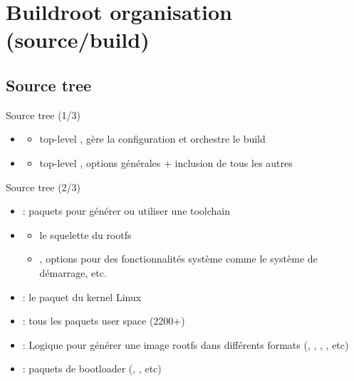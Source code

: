 \documentclass[aspectratio=169,obeyspaces,spaces,hyphens,dvipsnames]{beamer}
\begin{document}
\section{Buildroot organisation (source/build)}

\subsection{Source tree}

\begin{frame}{Source tree (1/3)}
  \begin{itemize}
  \item {}
    \begin{itemize}
    \item top-level , gère la configuration et orchestre le build
    \end{itemize}
  \item {}
    \begin{itemize}
    \item top-level , options générales + inclusion de tous les
      autres 
    \end{itemize}
  \end{itemize}
\end{frame}

\begin{frame}{Source tree (2/3)}
  \begin{itemize}
  \item {} : paquets pour générer ou utiliser une toolchain
  \item {}
    \begin{itemize}
    \item {} le squelette du rootfs
    \item {}, options pour des fonctionnalités système comme
      le système de démarrage, etc.
    \end{itemize}
  \item {} : le paquet du kernel Linux
  \item {} : tous les paquets user space (2200+)
  \item {} : Logique pour générer une image rootfs dans différents
    formats (, , , , etc)
  \item {} : paquets de bootloader (, , etc)
  \end{itemize}
\end{frame}
\end{document}
